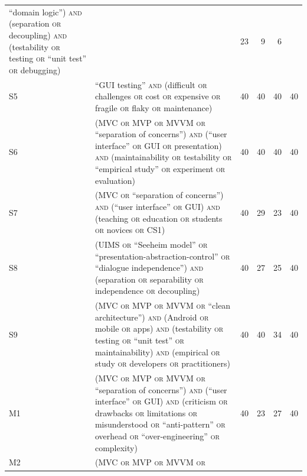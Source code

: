 \begin{table}[htbp]
\begin{tabularx}{\linewidth}{@{}l>{\raggedright\arraybackslash}X rrrr@{}}
         \enquote{domain logic}) \textsc{and} (separation \textsc{or}
         decoupling) \textsc{and} (testability \textsc{or} testing
         \textsc{or} \enquote{unit test} \textsc{or} debugging)
       & 40 & 23 & 9 & 6 \\
    S5 & \enquote{GUI testing} \textsc{and} (difficult \textsc{or}
         challenges \textsc{or} cost \textsc{or} expensive \textsc{or}
         fragile \textsc{or} flaky \textsc{or} maintenance)
       & 40 & 40 & 40 & 40 \\
    S6 & (MVC \textsc{or} MVP \textsc{or} MVVM \textsc{or}
         \enquote{separation of concerns}) \textsc{and} (\enquote{user
         interface} \textsc{or} GUI \textsc{or} presentation)
         \textsc{and} (maintainability \textsc{or} testability
         \textsc{or} \enquote{empirical study} \textsc{or} experiment
         \textsc{or} evaluation)
       & 40 & 40 & 40 & 40 \\
    S7 & (MVC \textsc{or} \enquote{separation of concerns})
         \textsc{and} (\enquote{user interface} \textsc{or} GUI)
         \textsc{and} (teaching \textsc{or} education \textsc{or}
         students \textsc{or} novices \textsc{or} CS1)
       & 40 & 29 & 23 & 40 \\
    S8 & (UIMS \textsc{or} \enquote{Seeheim model} \textsc{or}
         \enquote{presentation-abstraction-control} \textsc{or}
         \enquote{dialogue independence}) \textsc{and} (separation
         \textsc{or} separability \textsc{or} independence \textsc{or}
         decoupling)
       & 40 & 27 & 25 & 40 \\
    S9 & (MVC \textsc{or} MVP \textsc{or} MVVM \textsc{or} \enquote{clean
         architecture}) \textsc{and} (Android \textsc{or} mobile
         \textsc{or} apps) \textsc{and} (testability \textsc{or} testing
         \textsc{or} \enquote{unit test} \textsc{or} maintainability)
         \textsc{and} (empirical \textsc{or} study \textsc{or}
         developers \textsc{or} practitioners)
       & 40 & 40 & 34 & 40 \\
    \midrule
    M1 & (MVC \textsc{or} MVP \textsc{or} MVVM \textsc{or}
         \enquote{separation of concerns}) \textsc{and} (\enquote{user
         interface} \textsc{or} GUI) \textsc{and} (criticism \textsc{or}
         drawbacks \textsc{or} limitations \textsc{or} misunderstood
         \textsc{or} \enquote{anti-pattern} \textsc{or} overhead
         \textsc{or} \enquote{over-engineering} \textsc{or} complexity)
       & 40 & 23 & 27 & 40 \\
    M2 & (MVC \textsc{or} MVP \textsc{or} MVVM \textsc{or}

\end{tabularx}
\end{table}
